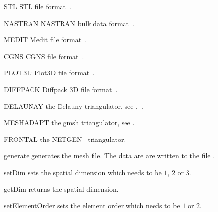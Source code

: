 \begin{memberdesc}[Design]{STL}
STL file format~\cite{STL}.
\end{memberdesc}
\begin{memberdesc}[Design]{NASTRAN}
NASTRAN  bulk data format~\cite{NASTRAN}.
\end{memberdesc}

\begin{memberdesc}[Design]{MEDIT}
Medit file format~\cite{MEDIT}.
\end{memberdesc}

\begin{memberdesc}[Design]{CGNS}
CGNS file format~\cite{CGNS}.
\end{memberdesc}

\begin{memberdesc}[Design]{PLOT3D}
Plot3D file format~\cite{PLOT3D}.
\end{memberdesc}


\begin{memberdesc}[Design]{DIFFPACK}
Diffpack 3D file format~\cite{DIFFPACK}.
\end{memberdesc}

\begin{memberdesc}[Design]{DELAUNAY}
the Delauny triangulator, see \gmshextern,~\cite{TETGEN}.
\end{memberdesc}

\begin{memberdesc}[Design]{MESHADAPT}
the gmsh triangulator, see \gmshextern.
\end{memberdesc}

\begin{memberdesc}[Design]{FRONTAL}
the NETGEN~\cite{NETGEN} triangulator.
\end{memberdesc}

\begin{methoddesc}[Design]{generate}{}
generates the mesh file. The data are are written to the file .
\end{methoddesc}


\begin{methoddesc}[Design]{setDim}{}
sets the spatial dimension which needs to be $1$, $2$ or $3$.
\end{methoddesc}

\begin{methoddesc}[Design]{getDim}{}
returns the spatial dimension.
\end{methoddesc}

\begin{methoddesc}[Design]{setElementOrder}{}
sets the element order which needs to be $1$ or $2$.
\end{methoddesc}

